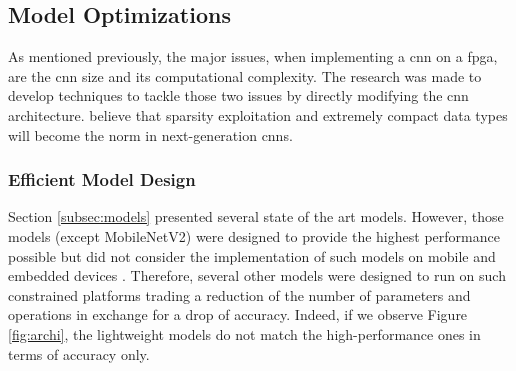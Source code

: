 \subsection{Model Optimizations} \label{subsec:mdopti}
As mentioned previously, the major issues, when implementing a \acrshort{cnn} on a \acrshort{fpga}, are the \acrshort{cnn} size and its computational complexity. The research was made to develop techniques to tackle those two issues by directly modifying the \acrshort{cnn} architecture. \textcite{nurvitadhi_can_2017} believe that sparsity exploitation and extremely compact data types will become the norm in next-generation \acrshort{cnn}s.
%
%
\subsubsection{Efficient Model Design}
%
Section \ref{subsec:models} presented several state of the art models. However, those models (except MobileNetV2) were designed to provide the highest performance possible but did not consider the implementation of such models on mobile and embedded devices \cite{iandola_squeezenet_2016}. Therefore, several other models were designed to run on such constrained platforms trading a reduction of the number of parameters and operations in exchange for a drop of accuracy. Indeed, if we observe Figure \ref{fig:archi}, the lightweight models do not match the high-performance ones in terms of accuracy only.

